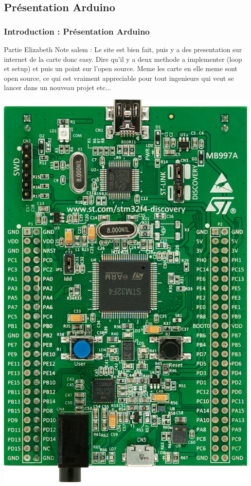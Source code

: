 \documentclass{beamer}
\begin{document}
\subsection{Présentation Arduino}
\begin{frame}
\frametitle{Introduction : Présentation Arduino}
Partie Elizabeth
Note salem : Le site est bien fait, puis y a des presentation sur internet de la carte
donc easy. Dire qu'il y a deux methode a implementer (loop et setup) et puis un point sur
l'open source. Meme les carte en elle meme sont open source, ce qui est vraiment appreciable
pour tout ingenieurs qui veut se lancer dans un nouveau projet etc...
\begin{center}
 \includegraphics[scale=0.1]{../images/stm32f4_discovery.jpg}
\end{center}
\end{frame}
\end{document}
